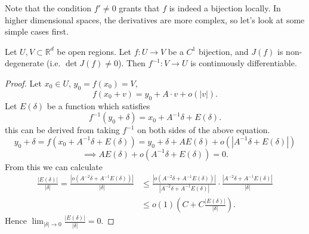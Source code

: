 Note that the condition $f' \ne 0$ grants that
$f$ is indeed a bijection locally.
In higher dimensional spaces, the derivatives are more complex,
so let's look at some simple cases first.
\begin{lemma}
	Let $U, V \subset \mathbb{R}^{d}$ be open regions.
	Let $f: U\to V$ be a $C^1$ bijection, and $J(f)$ is non-degenerate
	(i.e. $\det J(f)\ne 0$). Then $f^{-1}: V\to U$ is continuously differentiable.
\end{lemma}
\begin{proof}[Proof]
    Let $x_0\in U$, $y_0 = f(x_0) = V$,
	\[
	f(x_0 + v) = y_0 + A\cdot v + o(|v|).
	\]
	Let $E(\delta)$ be a function which satisfies
	\[
	f^{-1}(y_0+\delta) = x_0 + A^{-1}\delta + E(\delta).
	\]
	this can be derived from taking $f^{-1}$ on both sides
	of the above equation.
	\[
	y_0 + \delta = f(x_0 + A^{-1}\delta + E(\delta))
	= y_0 + \delta + AE(\delta) + o(|A^{-1}\delta + E(\delta)|)
	\]
	\[
	\implies AE(\delta) + o(A^{-1}\delta + E(\delta)) = 0.
	\]
	From this we can calculate
	\begin{align*}
	\frac{|E(\delta)|}{|\delta|} =
	\frac{|o(A^{-2}\delta + A^{-1}E(\delta))|}{|\delta|} &\le
	\frac{|o(A^{-2}\delta + A^{-1}E(\delta))|}{|A^{-2}\delta + A^{-1}E(\delta)|}
	\cdot \frac{|A^{-2}\delta + A^{-1}E(\delta)|}{|\delta|}\\
	&\le o(1)\left(C + C \frac{|E(\delta)|}{|\delta|}\right).
	\end{align*}
	Hence $ \lim_{|\delta|\to 0}\frac{|E(\delta)|}{|\delta|} = 0$.
\end{proof}

